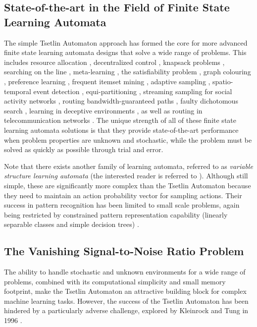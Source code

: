 \documentclass[11pt,a4paper]{article}
\begin{document}
\subsection{State-of-the-art in the Field of Finite State Learning Automata}
The simple Tsetlin Automaton approach has formed the core for more advanced finite state learning automata designs that solve a wide range of problems. This includes resource allocation \cite{Granmo2010g}, decentralized control \cite{Tung1996}, knapsack problems \cite{Granmo2007d}, searching on the line \cite{Oommen1997,Yazidi2014}, meta-learning \cite{Oommen2008}, the satisfiability problem \cite{Granmo2007c,Bouhmala2010}, graph colouring \cite{Bouhmala2010}, preference learning \cite{Yazidi2012b}, frequent itemset mining \cite{Haugland2014}, adaptive sampling \cite{Granmo2010}, spatio-temporal event detection \cite{Yazidi2013}, equi-partitioning \cite{Oommen1988}, streaming sampling for social activity networks \cite{Ghavipour2018}, routing bandwidth-guaranteed paths \cite{Oommen2007a}, faulty dichotomous search \cite{Yazidi2018}, learning in deceptive environments \cite{Zhang2016a}, as well as routing in telecommunication networks \cite{Oommen2007c}. The unique strength of all of these finite state learning automata solutions is that they provide state-of-the-art performance when problem properties are unknown and stochastic, while the problem must be solved as quickly as possible through trial and error.

Note that there exists another family of learning automata, referred to as \emph{variable structure learning automata} (the interested reader is referred to \cite{Thathachar2004}). Although still simple, these are significantly more complex than the Tsetlin Automaton because they need to maintain an action probability vector for sampling actions. Their success in pattern recognition has been limited to small scale problems, again being restricted by constrained pattern representation capability (linearly separable classes and simple decision trees) \cite{Thathachar2004,Barto1985,Narendra1989}.

\subsection{The Vanishing Signal-to-Noise Ratio Problem}

The ability to handle stochastic and unknown environments for a wide range of problems, combined with its computational simplicity and small memory footprint, make the Tsetlin Automaton an attractive building block for complex machine learning tasks. However, the success of the Tsetlin Automaton has been hindered by a   particularly adverse challenge, explored by Kleinrock and Tung in 1996 \cite{Tung1996}.
\end{document}
